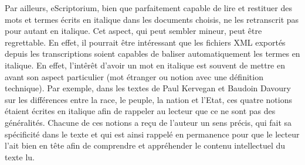 \documentclass{article}
\begin{document}
	Par ailleurs, eScriptorium, bien que parfaitement capable de lire et restituer des mots et termes écrits en italique dans les documents choisis, ne les retranscrit pas pour autant en italique. Cet aspect, qui peut sembler mineur, peut être regrettable. En effet, il pourrait être intéressant que les fichiers XML exportés depuis les transcriptions soient capables de baliser automatiquement les termes en italique. En effet, l'intêrêt d'avoir un mot en italique est souvent de mettre en avant son aspect particulier (mot étranger ou notion avec une définition technique). Par exemple, dans les textes de Paul Kervegan et Baudoin Davoury sur les différences entre la race, le peuple, la nation et l'Etat, ces quatre notions étaient écrites en italique afin de rappeler au lecteur que ce ne sont pas des généralités. Chacune de ces notions a reçu de l'auteur un sens précis, qui fait sa spécificité dans le texte et qui est ainsi rappelé en permanence pour que le lecteur l'ait bien en tête afin de comprendre et appréhender le contenu intellectuel du texte lu.
	
	\pagebreak
	\printbibliography[title=Bibliographie]
	
	\pagebreak
	\tableofcontents
\end{document}
